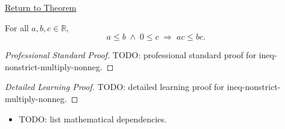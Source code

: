 \newpage
{}
\label{prf:ineq-nonstrict-multiply-nonneg}

\begin{remark*}[Return]
\hyperref[thm:ineq-nonstrict-multiply-nonneg]{Return to Theorem}
\end{remark*}

\begin{theorem*}
For all $a, b, c \in \mathbb{R}$,
\[
  a \le b \;\land\; 0 \le c \;\Rightarrow\; ac \le bc.
\]
\end{theorem*}

\begin{proof}[Professional Standard Proof]
\LRAProofBodyStart
TODO: professional standard proof for ineq-nonstrict-multiply-nonneg.
\end{proof}

\begin{proof}[Detailed Learning Proof]
\LRAProofBodyStart
TODO: detailed learning proof for ineq-nonstrict-multiply-nonneg.
\end{proof}

\begin{remark*}
\end{remark*}

\begin{dependencies}
\begin{itemize}
  \item TODO: list mathematical dependencies.
\end{itemize}
\end{dependencies}

\clearpage

